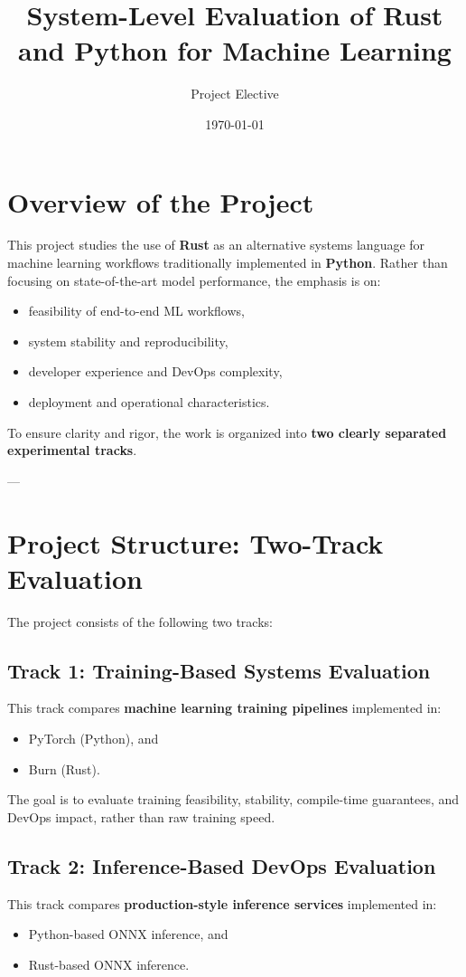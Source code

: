 \documentclass[10pt,a4paper,twocolumn]{article}
\title{\textbf{System-Level Evaluation of Rust and Python for Machine Learning}}
\author{Project Elective}
\date{\today}
\begin{document}
\maketitle
\section{Overview of the Project}

This project studies the use of \textbf{Rust} as an alternative systems language for machine learning workflows traditionally implemented in \textbf{Python}.  
Rather than focusing on state-of-the-art model performance, the emphasis is on:

\begin{itemize}
    \item feasibility of end-to-end ML workflows,
    \item system stability and reproducibility,
    \item developer experience and DevOps complexity,
    \item deployment and operational characteristics.
\end{itemize}

To ensure clarity and rigor, the work is organized into \textbf{two clearly separated experimental tracks}.

---

\section{Project Structure: Two-Track Evaluation}

The project consists of the following two tracks:

\subsection*{Track 1: Training-Based Systems Evaluation}
This track compares \textbf{machine learning training pipelines} implemented in:
\begin{itemize}
    \item PyTorch (Python), and
    \item Burn (Rust).
\end{itemize}

The goal is to evaluate training feasibility, stability, compile-time guarantees, and DevOps impact, rather than raw training speed.

\subsection*{Track 2: Inference-Based DevOps Evaluation}
This track compares \textbf{production-style inference services} implemented in:
\begin{itemize}
    \item Python-based ONNX inference, and
    \item Rust-based ONNX inference.
\end{itemize}
\end{document}
